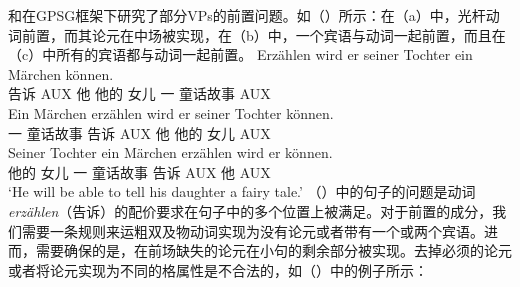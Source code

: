 \citet{Nerbonne86a}和\citet{Johnson86a}在GPSG框架下研究了部分VPs的前置问题。如（）所示：在（a）中，光杆动词前置，而其论元在中场被实现，在（b）中，一个宾语与动词一起前置，而且在（c）中所有的宾语都与动词一起前置。
\eal
\ex 
\gll Erzählen wird er seiner Tochter ein Märchen können.\\
     告诉  AUX 他 他的 女儿 一 童话故事 AUX\\
\ex 
\gll Ein Märchen erzählen wird er seiner Tochter können.\\
     一 童话故事 告诉 AUX 他 他的 女儿 AUX\\
\ex 
\gll Seiner Tochter ein Märchen erzählen wird er können.\\
     他的 女儿 一 童话故事 告诉 AUX 他 AUX\\
\glt `He will be able to tell his daughter a fairy tale.'
\zl
（）中的句子的问题是动词\emph{erzählen}（告诉）的配价要求在句子中的多个位置上被满足。对于前置的成分，我们需要一条规则来运粗双及物动词实现为没有论元或者带有一个或两个宾语。进而，需要确保的是，在前场缺失的论元在小句的剩余部分被实现。去掉必须的论元或者将论元实现为不同的格属性是不合法的，如（）中的例子所示：
\eal
{}
